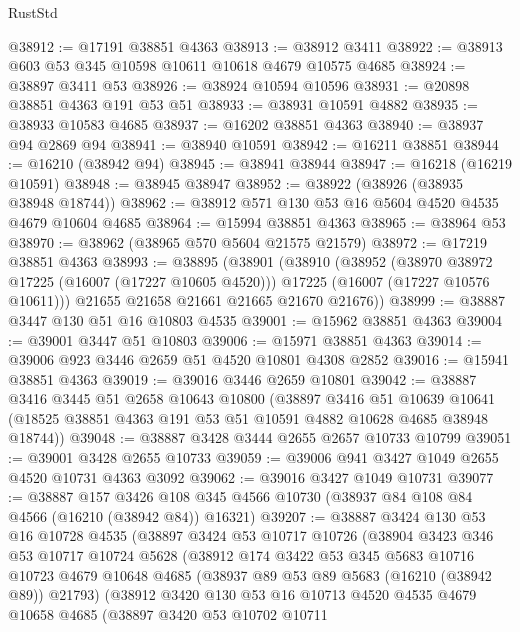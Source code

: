 \begin{lexlean}{RustStd}
\begin{coremodule}
@38912 := @17191 @38851 @4363
@38913 := @38912 @3411
@38922 := @38913 @603 @53 @345 @10598 @10611 @10618 @4679 @10575 @4685
@38924 := @38897 @3411 @53
@38926 := @38924 @10594 @10596
@38931 := @20898 @38851 @4363 @191 @53 @51
@38933 := @38931 @10591 @4882
@38935 := @38933 @10583 @4685
@38937 := @16202 @38851 @4363
@38940 := @38937 @94 @2869 @94
@38941 := @38940 @10591
@38942 := @16211 @38851
@38944 := @16210 (@38942 @94)
@38945 := @38941 @38944
@38947 := @16218 (@16219 @10591)
@38948 := @38945 @38947
@38952 := @38922 (@38926 (@38935 @38948 @18744))
@38962 := @38912 @571 @130 @53 @16 @5604 @4520 @4535 @4679 @10604 @4685
@38964 := @15994 @38851 @4363
@38965 := @38964 @53
@38970 := @38962 (@38965 @570 @5604 @21575 @21579)
@38972 := @17219 @38851 @4363
@38993 := @38895
    (@38901
      (@38910
        (@38952
          (@38970 @38972 @17225 (@16007 (@17227 @10605 @4520)))
          @17225
          (@16007 (@17227 @10576 @10611)))
        @21655
        @21658
        @21661
        @21665
        @21670
        @21676))
@38999 := @38887 @3447 @130 @51 @16 @10803 @4535
@39001 := @15962 @38851 @4363
@39004 := @39001 @3447 @51 @10803
@39006 := @15971 @38851 @4363
@39014 := @39006 @923 @3446 @2659 @51 @4520 @10801 @4308 @2852
@39016 := @15941 @38851 @4363
@39019 := @39016 @3446 @2659 @10801
@39042 := @38887
    @3416
    @3445
    @51
    @2658
    @10643
    @10800
    (@38897
      @3416
      @51
      @10639
      @10641
      (@18525 @38851 @4363 @191 @53 @51 @10591 @4882 @10628 @4685 @38948 @18744))
@39048 := @38887 @3428 @3444 @2655 @2657 @10733 @10799
@39051 := @39001 @3428 @2655 @10733
@39059 := @39006 @941 @3427 @1049 @2655 @4520 @10731 @4363 @3092
@39062 := @39016 @3427 @1049 @10731
@39077 := @38887
    @157
    @3426
    @108
    @345
    @4566
    @10730
    (@38937 @84 @108 @84 @4566 (@16210 (@38942 @84)) @16321)
@39207 := @38887
    @3424
    @130
    @53
    @16
    @10728
    @4535
    (@38897
      @3424
      @53
      @10717
      @10726
      (@38904
        @3423
        @346
        @53
        @10717
        @10724
        @5628
        (@38912
          @174
          @3422
          @53
          @345
          @5683
          @10716
          @10723
          @4679
          @10648
          @4685
          (@38937 @89 @53 @89 @5683 (@16210 (@38942 @89)) @21793)
          (@38912
            @3420
            @130
            @53
            @16
            @10713
            @4520
            @4535
            @4679
            @10658
            @4685
            (@38897
              @3420
              @53
              @10702
              @10711

\end{coremodule}
\end{lexlean}
